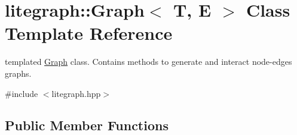 \hypertarget{classlitegraph_1_1Graph}{}\section{litegraph\+:\+:Graph$<$ T, E $>$ Class Template Reference}
\label{classlitegraph_1_1Graph}


templated \hyperlink{classlitegraph_1_1Graph}{Graph} class. Contains methods to generate and interact node-\/edges graphs.  




{\ttfamily \#include $<$litegraph.\+hpp$>$}

\subsection*{Public Member Functions}
